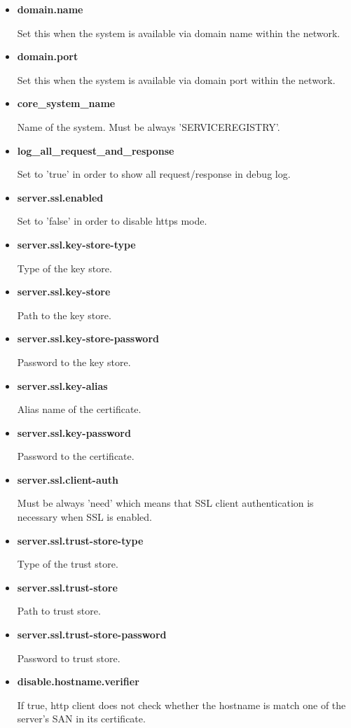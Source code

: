 \documentclass[a4paper]{arrowhead}
\begin{document}
\begin{itemize}
  \item \textbf{domain.name}
  
  Set this when the system is available via domain name within the network.
  
  \item \textbf{domain.port}
  
  Set this when the system is available via domain port within the network.
  
  \item \textbf{core\_system\_name}
  
  Name of the system. Must be always 'SERVICEREGISTRY'.
  
  \item \textbf{log\_all\_request\_and\_response}
  
  Set to 'true' in order to show all request/response in debug log.
  
  \item \textbf{server.ssl.enabled}
  
  Set to 'false' in order to disable https mode.
  
  \item \textbf{server.ssl.key-store-type}
  
  Type of the key store.
  
  \item \textbf{server.ssl.key-store}
  
  Path to the key store.
  
  \item \textbf{server.ssl.key-store-password}
  
  Password to the key store.
  
  \item \textbf{server.ssl.key-alias}
  
  Alias name of the certificate.
  
  \item \textbf{server.ssl.key-password}
  
  Password to the certificate.
  
  \item \textbf{server.ssl.client-auth}
  
  Must be always 'need' which means that SSL client authentication is necessary when SSL is enabled.
  
  \item \textbf{server.ssl.trust-store-type}
  
  Type of the trust store.
  
  \item \textbf{server.ssl.trust-store}
  
  Path to trust store.
  
  \item \textbf{server.ssl.trust-store-password}
  
  Password to trust store.
  
  \item \textbf{disable.hostname.verifier}
  
  If true, http client does not check whether the hostname is match one of the server's SAN in its certificate.
  \end{itemize}
  
\end{document}
